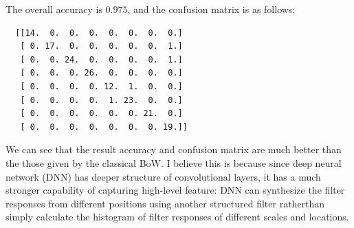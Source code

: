 \documentclass[11pt]{article}
\begin{document}
The overall accuracy is $0.975$, and the confusion matrix is as follows:

\begin{verbatim}
  [[14.  0.  0.  0.  0.  0.  0.  0.]
   [ 0. 17.  0.  0.  0.  0.  0.  1.]
   [ 0.  0. 24.  0.  0.  0.  0.  1.]
   [ 0.  0.  0. 26.  0.  0.  0.  0.]
   [ 0.  0.  0.  0. 12.  1.  0.  0.]
   [ 0.  0.  0.  0.  1. 23.  0.  0.]
   [ 0.  0.  0.  0.  0.  0. 21.  0.]
   [ 0.  0.  0.  0.  0.  0.  0. 19.]]
\end{verbatim}

We can see that the result accuracy and confusion matrix are much better than the those given by the classical BoW. I believe this is because since deep neural network (DNN) has deeper structure of convolutional layers, it has a much stronger capability of capturing high-level feature: DNN can synthesize the filter responses from different positions using another structured filter ratherthan simply calculate the histogram of filter responses of different scales and locations.
\end{document}

